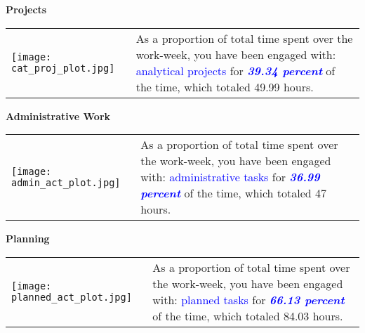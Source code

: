 \documentclass[a4paper]{article}
\begin{document}
\begin{center}
\Large{\textbf{Projects}}
 \end{center}
\begin{table}[h!]
     \begin{center}
     \begin{tabular}{m{10cm} m{7cm}}
     \begin {minipage} {10cm}
     \texttt{[image: cat\_proj\_plot.jpg]}
     \end{minipage}
      & 
      \begin{minipage}{7cm}
      \Large{As a proportion of total time spent over the work-week, you have been engaged with: \textcolor{blue}{analytical projects} for \textbf{\textcolor{blue}{\emph{39.34 percent}}} of the time, which totaled 49.99 hours.}
      \end{minipage}
      \end{tabular}
      \end{center}
      \end{table}

\newpage

\begin{center}
\Large{\textbf{Administrative Work}}
 \end{center}
\begin{table}[h!]
     \begin{center}
     \begin{tabular}{m{10cm} m{7cm}}
     \begin {minipage} {10cm}
     \texttt{[image: admin\_act\_plot.jpg]}
     \end{minipage}
      & 
      \begin{minipage}{7cm}
      \Large{As a proportion of total time spent over the work-week, you have been engaged with: \textcolor{blue}{administrative tasks} for \textbf{\textcolor{blue}{\emph{36.99 percent}}} of the time, which totaled 47 hours.}
      \end{minipage}
      \end{tabular}
      \end{center}
      \end{table}

\begin{center}
\Large{\textbf{Planning}}
 \end{center}
\begin{table}[h!]
     \begin{center}
     \begin{tabular}{m{10cm} m{7cm}}
     \begin {minipage} {10cm}
     \texttt{[image: planned\_act\_plot.jpg]}
     \end{minipage}
      & 
      \begin{minipage}{7cm}
      \Large{As a proportion of total time spent over the work-week, you have been engaged with: \textcolor{blue}{planned tasks} for \textbf{\textcolor{blue}{\emph{66.13 percent}}} of the time, which totaled 84.03 hours.}
      \end{minipage}
      \end{tabular}
      \end{center}
      \end{table}
\end{document}
